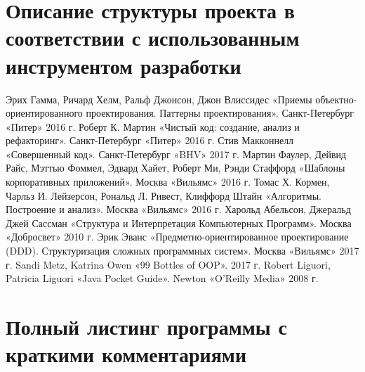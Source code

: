 \documentclass[russian,utf8,simple,hpadding=10mm,vpadding=20mm]{eskdtext}
\begin{document}
\newpage
\parindent=15mm
\linespread{1,5}
\section{Описание структуры проекта в соответствии с использованным инструментом разработки}

\newpage
\begin{thebibliography}{99}
	Эрих Гамма, Ричард Хелм, Ральф Джонсон, Джон Влиссидес «Приемы объектно-ориентированного проектирования. Паттерны проектирования». Санкт-Петербург «Питер» 2016 г.
	Роберт К. Мартин «Чистый код: создание, анализ и рефакторинг». Санкт-Петербург «Питер» 2016 г.
	Стив Макконнелл «Совершенный код». Санкт-Петербург «BHV» 2017 г.
	Мартин Фаулер, Дейвид Райс, Мэттью Фоммел, Эдвард Хайет, Роберт Ми, Рэнди Стаффорд «Шаблоны корпоративных приложений». Москва «Вильямс» 2016 г.
	Томас Х. Кормен, Чарльз И. Лейзерсон, Рональд Л. Ривест, Клиффорд Штайн «Алгоритмы. Построение и анализ». Москва «Вильямс» 2016 г.
	Харольд Абельсон, Джеральд Джей Сассман «Структура и Интерпретация Компьютерных Программ». Москва «Добросвет» 2010 г.
	Эрик Эванс «Предметно-ориентированное проектирование (DDD). Структуризация сложных программных систем». Москва «Вильямс» 2017 г.
	Sandi Metz, Katrina Owen «99 Bottles of OOP». 2017 г.
	Robert Liguori, Patricia Liguori «Java Pocket Guide». Newton «O'Reilly Media» 2008 г.
\end{thebibliography}

\newpage
\parindent=12.5mm
\linespread{1,5}
\section*{Полный листинг программы с краткими комментариями}
%



\end{document}
